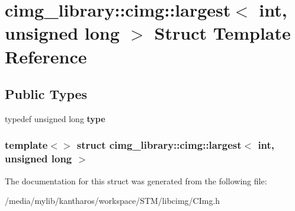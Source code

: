 \hypertarget{structcimg__library_1_1cimg_1_1largest_3_01int_00_01unsigned_01long_01_4}{
\section{cimg\_\-library::cimg::largest$<$ int, unsigned long $>$ Struct Template Reference}
\label{structcimg__library_1_1cimg_1_1largest_3_01int_00_01unsigned_01long_01_4}
}
\subsection*{Public Types}
\begin{DoxyCompactItemize}
\item 
\hypertarget{structcimg__library_1_1cimg_1_1largest_3_01int_00_01unsigned_01long_01_4_a9114a3d924711e02a9089844a9c08a0f}{
typedef unsigned long {\bfseries type}}
\label{structcimg__library_1_1cimg_1_1largest_3_01int_00_01unsigned_01long_01_4_a9114a3d924711e02a9089844a9c08a0f}

\end{DoxyCompactItemize}
\subsubsection*{template$<$$>$ struct cimg\_\-library::cimg::largest$<$ int, unsigned long $>$}



The documentation for this struct was generated from the following file:\begin{DoxyCompactItemize}
\item 
/media/mylib/kantharos/workspace/STM/libcimg/CImg.h\end{DoxyCompactItemize}
